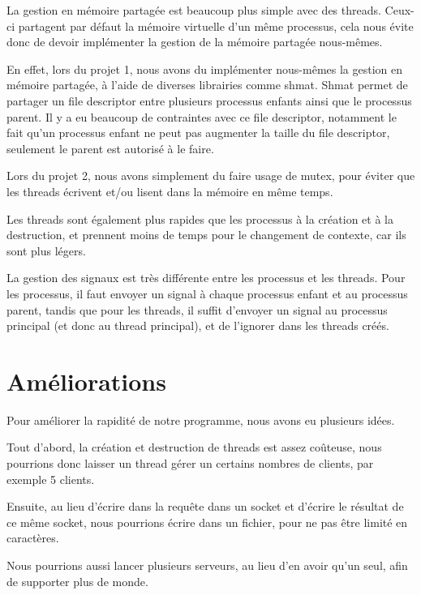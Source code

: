 \documentclass[utf8]{article}
\begin{document}
\begin{large}
La gestion en mémoire partagée est beaucoup plus simple avec des threads.
Ceux-ci partagent par défaut la mémoire virtuelle d'un même processus, cela nous
évite donc de devoir implémenter la gestion de la mémoire partagée nous-mêmes.
\par
En effet, lors du projet 1, nous avons du implémenter nous-mêmes la gestion en
mémoire partagée, à l'aide de diverses librairies comme shmat. Shmat permet de
partager un file descriptor entre plusieurs processus enfants ainsi que le
processus parent. Il y a eu beaucoup de contraintes avec ce file descriptor,
notamment le fait qu'un processus enfant ne peut pas augmenter la taille du file
descriptor, seulement le parent est autorisé à le faire. 
\par
Lors du projet 2, nous
avons simplement du faire usage de mutex, pour éviter que les threads écrivent
et/ou lisent dans la mémoire en même temps.
\par
Les threads sont également plus rapides que les processus à la création et à la
destruction, et prennent moins de temps pour le changement de contexte, car ils
sont plus légers.\par La gestion des signaux est très différente entre les
processus et les threads. Pour les processus, il faut envoyer un signal à chaque
processus enfant et au processus parent, tandis que pour les threads, il suffit
d'envoyer un signal au processus principal (et donc au thread principal), et de
l'ignorer dans les threads créés.




\par
\section{Améliorations}
\par
\indent

Pour améliorer la rapidité de notre programme, nous avons eu plusieurs idées.

Tout d'abord, la création et destruction de threads est assez coûteuse, nous pourrions donc
laisser un thread gérer un certains nombres de clients, par exemple 5 clients.
\par

Ensuite, au lieu d'écrire dans la requête dans un socket et d'écrire le résultat
de ce même socket, nous pourrions écrire dans un fichier, pour ne pas être
limité en caractères.

Nous pourrions aussi lancer plusieurs serveurs, au lieu d'en avoir qu'un seul,
afin de supporter plus de monde.


\end{large}
\end{document}
